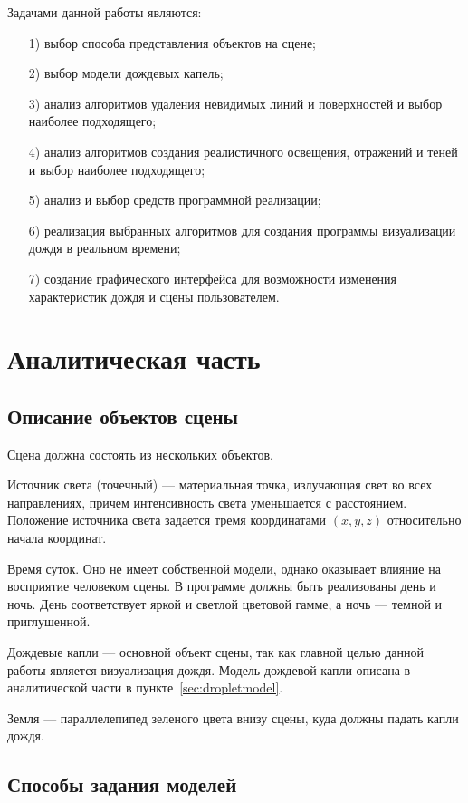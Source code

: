 Задачами данной работы являются:
\begin{enumerate}
\item[1)]
выбор способа представления объектов на сцене;
\item[2)]
выбор модели дождевых капель;
\item[3)]
анализ алгоритмов удаления невидимых линий и поверхностей и выбор наиболее подходящего;
\item[4)]
анализ алгоритмов создания реалистичного освещения, отражений и теней и выбор наиболее подходящего;
\item[5)]
анализ и выбор средств программной реализации;
\item[6)]
реализация выбранных алгоритмов для создания программы визуализации дождя в реальном времени;
\item[7)]
создание графического интерфейса для возможности изменения характеристик дождя и сцены пользователем.
\end{enumerate}

\chapter{Аналитическая часть}

\section{Описание объектов сцены}

Сцена должна состоять из нескольких объектов.

Источник света (точечный) --- материальная точка, излучающая свет во всех направлениях, причем интенсивность света уменьшается с расстоянием. 
Положение источника света задается тремя координатами $(x, y, z)$ относительно начала координат.

Время суток. 
Оно не имеет собственной модели, однако оказывает влияние на восприятие человеком сцены. 
В программе должны быть реализованы день и ночь. 
День соответствует яркой и светлой цветовой гамме, а ночь --- темной и приглушенной.

Дождевые капли --- основной объект сцены, так как главной целью данной работы является визуализация дождя. 
Модель дождевой капли описана в аналитической части в пункте~\ref{sec:dropletmodel}.

Земля --- параллелепипед зеленого цвета внизу сцены, куда должны падать капли дождя. 

\section{Способы задания моделей}


